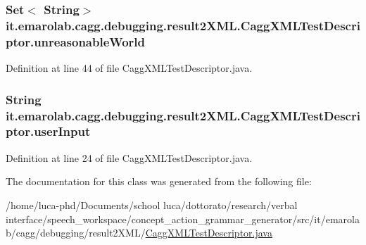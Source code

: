 \hypertarget{classit_1_1emarolab_1_1cagg_1_1debugging_1_1result2XML_1_1CaggXMLTestDescriptor_a842cd24af73a70b208b3a039350646d1}{
\subsubsection[{unreasonable\-World}]{\setlength{\rightskip}{0pt plus 5cm}Set$<$ String$>$ it.\-emarolab.\-cagg.\-debugging.\-result2\-X\-M\-L.\-Cagg\-X\-M\-L\-Test\-Descriptor.\-unreasonable\-World\hspace{0.3cm}{\ttfamily [private]}}}\label{classit_1_1emarolab_1_1cagg_1_1debugging_1_1result2XML_1_1CaggXMLTestDescriptor_a842cd24af73a70b208b3a039350646d1}


Definition at line 44 of file Cagg\-X\-M\-L\-Test\-Descriptor.\-java.

\hypertarget{classit_1_1emarolab_1_1cagg_1_1debugging_1_1result2XML_1_1CaggXMLTestDescriptor_ae2b578d76319d142886735f1106232a6}{
\subsubsection[{user\-Input}]{\setlength{\rightskip}{0pt plus 5cm}String it.\-emarolab.\-cagg.\-debugging.\-result2\-X\-M\-L.\-Cagg\-X\-M\-L\-Test\-Descriptor.\-user\-Input\hspace{0.3cm}{\ttfamily [private]}}}\label{classit_1_1emarolab_1_1cagg_1_1debugging_1_1result2XML_1_1CaggXMLTestDescriptor_ae2b578d76319d142886735f1106232a6}


Definition at line 24 of file Cagg\-X\-M\-L\-Test\-Descriptor.\-java.



The documentation for this class was generated from the following file\-:\begin{DoxyCompactItemize}
\item 
/home/luca-\/phd/\-Documents/school luca/dottorato/research/verbal interface/speech\-\_\-workspace/concept\-\_\-action\-\_\-grammar\-\_\-generator/src/it/emarolab/cagg/debugging/result2\-X\-M\-L/\hyperlink{CaggXMLTestDescriptor_8java}{Cagg\-X\-M\-L\-Test\-Descriptor.\-java}\end{DoxyCompactItemize}
